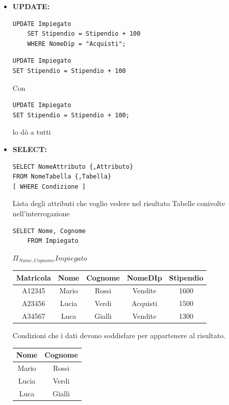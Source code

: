 \documentclass{article}
\begin{document}
\begin{itemize}
\item \textbf{UPDATE:}

\begin{minipage}{0.4\textwidth}
	\begin{lstlisting}[style=sqlstyle]
	UPDATE Impiegato
	SET Stipendio = Stipendio + 100
	WHERE NomeDip = "Acquisti";
	\end{lstlisting}
\end{minipage}
\hfill
\begin{minipage}{0.4\textwidth}
\begin{lstlisting}[style=sqlstyle]
UPDATE Impiegato
SET Stipendio = Stipendio + 100
\end{lstlisting}
\end{minipage}

Con 
\begin{lstlisting}[style=sqlstyle]
UPDATE Impiegato
SET Stipendio = Stipendio + 100;
\end{lstlisting}
lo dò a tutti

\item \textbf{SELECT:}
\begin{lstlisting}[style=sqlstyle]
SELECT NomeAttributo {,Attributo}
FROM NomeTabella {,Tabella}
[ WHERE Condizione ]
\end{lstlisting}
Lista degli attributi che voglio vedere nel risultato
Tabelle conivolte nell'interrogazione
\begin{lstlisting}[style=sqlstyle]
	SELECT Nome, Cognome
	FROM Impiegato
\end{lstlisting}

$\Pi_{Nome,Cognome} Impiegato$

\begin{tabular}{|c|c|c|c|c|}
	\hline
	\textbf{Matricola} & \textbf{Nome} & \textbf{Cognome} & \textbf{NomeDIp} & \textbf{Stipendio} \\
	\hline
	A12345 & Mario & Rossi & Vendite & 1600 \\
	\hline
	A23456 & Lucia & Verdi & Acquisti & 1500 \\
	\hline
	A34567 & Luca & Gialli & Vendite & 1300\\
	\hline
\end{tabular}

Condizioni che i dati devono soddisfare per appartenere al risultato. 

\begin{tabular}{|c|c|}
	\hline \textbf{Nome} & \textbf{Cognome} \\
	\hline
	 Mario & Rossi \\
	\hline
	 Lucia & Verdi \\
	\hline
	 Luca & Gialli \\
	\hline
\end{tabular}



\end{itemize}
\end{document}

